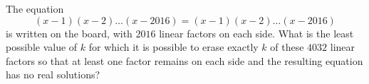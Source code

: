 The equation
\[ (x-1)(x-2)\dots(x-2016)=(x-1)(x-2)\dots (x-2016) \]
is written on the board, with $2016$ linear factors on each side.
What is the least possible value of $k$ for which it is possible to
erase exactly $k$ of these $4032$ linear factors so that at least
one factor remains on each side and the resulting equation
has no real solutions?